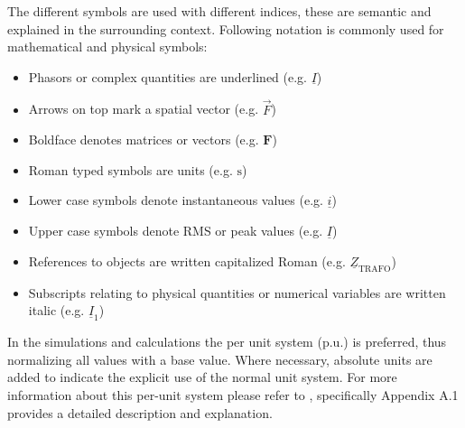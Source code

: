 The different symbols are used with different indices, these are semantic and explained in the surrounding context. Following notation is commonly used for mathematical and physical symbols:
\begin{itemize}[noitemsep]
    \item Phasors or complex quantities are underlined (e.g. $\underline{I}$)
    \item Arrows on top mark a spatial vector (e.g. $\overrightarrow{F}$)
    \item Boldface denotes matrices or vectors (e.g. $\bm{F}$)
    \item Roman typed symbols are units (e.g. $\mathrm{s}$)
    \item Lower case symbols denote instantaneous values (e.g. $\underline{i}$)
    \item Upper case symbols denote \acs{RMS} or peak values (e.g. $\underline{I}$)
    \item References to objects are written capitalized Roman (e.g. $\underline{Z}_\mathrm{TRAFO}$)
    \item Subscripts relating to physical quantities or numerical variables are written italic (e.g. $\underline{I}_1$) 
\end{itemize}

In the simulations and calculations the per unit system ($\mathrm{p.u.}$) is preferred, thus normalizing all values with a base value. Where necessary, absolute units are added to indicate the explicit use of the normal unit system. For more information about this per-unit system please refer to \textcite{machowskiPowerSystemDynamics2020}, specifically Appendix A.1 provides a detailed description and explanation.